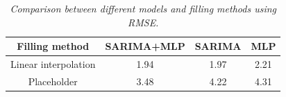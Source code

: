 \begin{table}
 \begin{tabular}{|c|c|c|c|} 
 \hline
 Filling method & SARIMA+MLP & SARIMA & MLP \\
 \hline \hline
 Linear interpolation & 1.94 & 1.97 & 2.21 \\
 Placeholder & 3.48 & 4.22 & 4.31 \\
 \hline
 \end{tabular}
 \caption{\textit{Comparison between different models and filling methods using RMSE.}}
 \label{table:RMSE}
\end{table}








